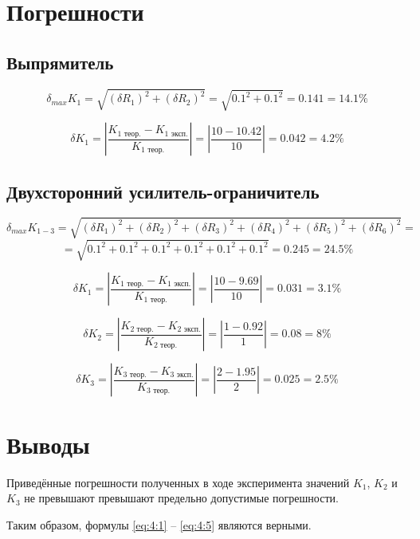 \section{Погрешности}

\subsection{Выпрямитель}

\begin{displaymath}
	\delta_{max} K_1 = \sqrt{(\delta R_1)^2 + (\delta R_2)^2} = \sqrt{0.1^2 + 0.1^2} = 0.141 = 14.1 \%
\end{displaymath}

\begin{displaymath}
	\delta K_1 = \left| \frac{K_{1 \text{ теор.}} - K_{1 \text{ эксп.}}}{K_{1 \text{ теор.}}} \right| = \left| \frac{10 - 10.42}{10} \right| = 0.042 = 4.2 \%
\end{displaymath}

\subsection{Двухсторонний усилитель-ограничитель}

\begin{displaymath}
	\delta_{max} K_{1-3} = \sqrt{(\delta R_1)^2 + (\delta R_2)^2 + (\delta R_3)^2 + (\delta R_4)^2 + (\delta R_5)^2 + (\delta R_6)^2} = 
\end{displaymath}
\begin{displaymath}
	= \sqrt{0.1^2 + 0.1^2 + 0.1^2 + 0.1^2 + 0.1^2 + 0.1^2} = 0.245 = 24.5 \%
\end{displaymath}

\begin{displaymath}
	\delta K_1 = \left| \frac{K_{1 \text{ теор.}} - K_{1 \text{ эксп.}}}{K_{1 \text{ теор.}}} \right| = \left| \frac{10 - 9.69}{10} \right| = 0.031 = 3.1 \%
\end{displaymath}

\begin{displaymath}
	\delta K_2 = \left| \frac{K_{2 \text{ теор.}} - K_{2 \text{ эксп.}}}{K_{2 \text{ теор.}}} \right| = \left| \frac{1 - 0.92}{1} \right| = 0.08 = 8 \%
\end{displaymath}

\begin{displaymath}
	\delta K_3 = \left| \frac{K_{3 \text{ теор.}} - K_{3 \text{ эксп.}}}{K_{3 \text{ теор.}}} \right| = \left| \frac{2 - 1.95}{2} \right| = 0.025 = 2.5 \%
\end{displaymath}

\section{Выводы}

Приведённые погрешности полученных в ходе эксперимента значений $K_1$, $K_2$ и $K_3$ не превышают превышают предельно допустимые погрешности.

Таким образом, формулы \ref{eq:4:1} -- \ref{eq:4:5} являются верными.

